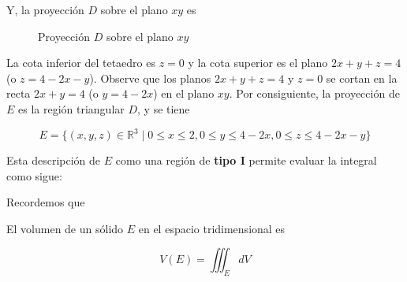 \documentclass[12pt]{exam}
\begin{document}
\begin{questions}
  Y, la proyección $D$ sobre el plano $xy$ es

  \begin{figure}[H]
    \centering
    \caption{Proyección $D$ sobre el plano $xy$}
  \end{figure}

  La cota inferior del tetaedro es $z=0$ y la cota superior es el plano $2x+y+z=4$ (o $z=4-2x-y$). Observe que los planos $2x+y+z=4$ y $z=0$ se cortan en la recta $2x+y=4$ (o $y=4-2x$) 
  en el plano $xy$. Por consiguiente, la proyección de $E$ es la región triangular $D$, y se tiene

  \[
  E = \{ (x,y,z) \in \mathbb{R}^3 \mid 0 \leq x \leq 2, 0 \leq y \leq 4-2x, 0 \leq z \leq 4-2x-y \}
  \]

  Esta descripción de $E$ como una región de \textbf{tipo I} permite evaluar la integral como sigue:

  Recordemos que

  \begin{tcolorbox}[colback=white, colframe=blue!40!black, title=\textbf{Volumen de un sólido}]
    El volumen de un sólido $E$ en el espacio tridimensional es

    \[
    V(E) = \iiint_E dV
    \]
  \end{tcolorbox}


\end{questions}
\end{document}

